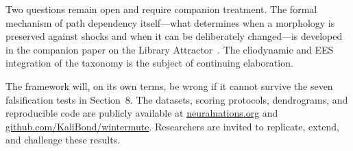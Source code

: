 \documentclass[12pt,a4paper]{article}
\begin{document}
Two questions remain open and require companion treatment. The formal mechanism of path dependency itself---what determines when a morphology is preserved against shocks and when it can be deliberately changed---is developed in the companion paper on the Library Attractor~\cite{mckern2026library}. The cliodynamic and EES integration of the taxonomy is the subject of continuing elaboration.

The framework will, on its own terms, be wrong if it cannot survive the seven falsification tests in Section~8. The datasets, scoring protocols, dendrograms, and reproducible code are publicly available at \href{https://neuralnations.org}{neuralnations.org} and \href{https://github.com/KaliBond/wintermute}{github.com/KaliBond/wintermute}. Researchers are invited to replicate, extend, and challenge these results.
\end{document}
